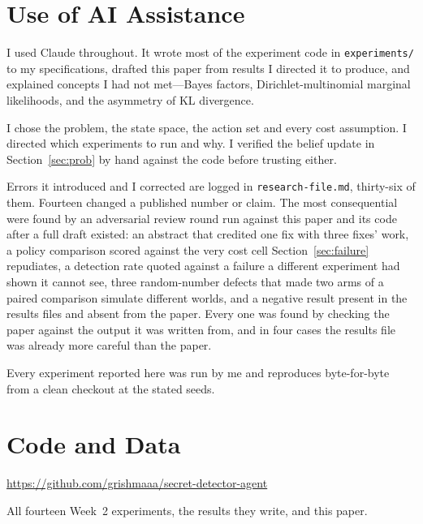 \documentclass{article}
\begin{document}
\section*{Use of AI Assistance}

I used Claude throughout. It wrote most of the experiment code in
\texttt{experiments/} to my specifications, drafted this paper from results I
directed it to produce, and explained concepts I had not met---Bayes factors,
Dirichlet-multinomial marginal likelihoods, and the asymmetry of KL divergence.

I chose the problem, the state space, the action set and every cost assumption. I
directed which experiments to run and why. I verified the belief update in
Section~\ref{sec:prob} by hand against the code before trusting either.

Errors it introduced and I corrected are logged in \texttt{research-file.md},
thirty-six of them. Fourteen changed a published number or claim. The most
consequential were found by an adversarial review round run against this paper
and its code after a full draft existed: an abstract that credited one fix with
three fixes' work, a policy comparison scored against the very cost cell
Section~\ref{sec:failure} repudiates, a detection rate quoted against a failure
a different experiment had shown it cannot see, three random-number defects that
made two arms of a paired comparison simulate different worlds, and a negative
result present in the results files and absent from the paper. Every one was
found by checking the paper against the output it was written from, and in four
cases the results file was already more careful than the paper.

Every experiment reported here was run by me and reproduces byte-for-byte from a
clean checkout at the stated seeds.

\section*{Code and Data}

\url{https://github.com/grishmaaa/secret-detector-agent}

All fourteen Week~2 experiments, the results they write, and this paper.




\appendix
\end{document}
